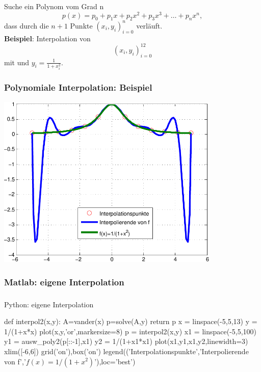 \documentclass[hyperref={xetex}]{beamer}
\begin{document}
% 
% 
\begin{frame}[fragile]\frametitle{}
Suche ein Polynom vom Grad n
\[ p(x)= p_0 +p_1 x +p_2 x^2 +p_3 x^3+ \dots +p_n x^n,  \]
 dass durch die  $n+1$ Punkte $(x_i,y_i)_{i=0}^n$
verläuft.\\[1cm]

\textbf{Beispiel}: Interpolation von
\[ (x_i,y_i)_{i=0}^{12} \]
mit  und $y_i=\frac{1}{1+x_i^2}$. 
\end{frame}
% 
% 
\begin{frame}[fragile]\frametitle{Polynomiale Interpolation: Beispiel}
\begin{center}
\includegraphics[width=0.8\textwidth]{figures/grafik_7}
\end{center}
\end{frame}
% 
% 
\begin{frame}[fragile]\frametitle{Matlab: eigene Interpolation}
\end{frame}

% 
% 
\begin{frame}[fragile]\frametitle{}
\end{frame}
\begin{frame}[fragile]{Python: eigene Interpolation}
\begin{pyin}
def interpol2(x,y):
    A=vander(x)
    p=solve(A,y)
    return p  
x = linspace(-5,5,13)
y = 1/(1+x*x)
plot(x,y,'or',markersize=8)
p = interpol2(x,y)
x1 = linspace(-5,5,100)
y1 = ausw_poly2(p[::-1],x1)
y2 = 1/(1+x1*x1)
plot(x1,y1,x1,y2,linewidth=3)
xlim([-6,6])
grid('on'),box('on')
legend(('Interpolationspunkte','Interpolierende von f','$f(x)=1/(1+x^2)$'),loc='best')  
\end{pyin}
  
\end{frame}
\end{document}
